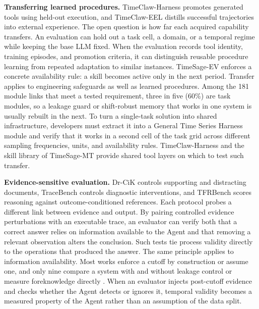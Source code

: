 \documentclass[preprints,article,submit,moreauthors]{Definitions/mdpi}
\begin{document}
\noindent\textbf{Transferring learned procedures.} TimeClaw-Harness \citep{timeclaw2026harness} promotes generated tools using held-out execution, and TimeClaw-EEL \citep{timeclaw2026explore} distills successful trajectories into external experience. The open question is how far each acquired capability transfers. An evaluation can hold out a task cell, a domain, or a temporal regime while keeping the base LLM fixed. When the evaluation records tool identity, training episodes, and promotion criteria, it can distinguish reusable procedure learning from repeated adaptation to similar instances. TimeSage-EV \citep{timesageev2026} enforces a concrete availability rule: a skill becomes active only in the next period. Transfer applies to engineering safeguards as well as learned procedures. Among the 181 module links that meet a tested requirement, three in five (60\%) are task modules, so a leakage guard or shift-robust memory that works in one system is usually rebuilt in the next. To turn a single-task solution into shared infrastructure, developers must extract it into a General Time Series Harness module and verify that it works in a second cell of the task grid across different sampling frequencies, units, and availability rules. TimeClaw-Harness \citep{timeclaw2026harness} and the skill library of TimeSage-MT \citep{timesagemt2026} provide shared tool layers on which to test such transfer.

\noindent\textbf{Evidence-sensitive evaluation.} Dr-CiK \citep{drcik2026} controls supporting and distracting documents, TraceBench \citep{tracebench2026} controls diagnostic interventions, and TFRBench \citep{tfrbench2026} scores reasoning against outcome-conditioned references. Each protocol probes a different link between evidence and output. By pairing controlled evidence perturbations with an executable trace, an evaluator can verify both that a correct answer relies on information available to the Agent and that removing a relevant observation alters the conclusion. Such tests tie process validity directly to the operations that produced the answer. The same principle applies to information availability. Most works enforce a cutoff by construction or assume one, and only nine compare a system with and without leakage control or measure foreknowledge directly \citep{openforecaster2026,tiem2026,aiaforecaster2025}. When an evaluator injects post-cutoff evidence and checks whether the Agent detects or ignores it, temporal validity becomes a measured property of the Agent rather than an assumption of the data split.
\end{document}
